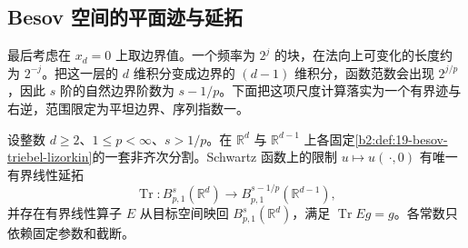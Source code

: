\subsection{Besov 空间的平面迹与延拓}
\label{b2:subsec:190505}

最后考虑在 \(x_d=0\) 上取边界值。一个频率为 \(2^j\) 的块，在法向上可变化的长度约为 \(2^{-j}\)。把这一层的 \(d\) 维积分变成边界的 \((d-1)\) 维积分，函数范数会出现 \(2^{j/p}\)，因此 \(s\) 阶的自然边界阶数为 \(s-1/p\)。下面把这项尺度计算落实为一个有界迹与右逆，范围限定为平坦边界、序列指数一。

\begin{proposition}
\label{b2:prop:19-flat-besov-trace}
设整数 \(d\geq2\)、\(1\leq p<\infty\)、\(s>1/p\)。在 \(\mathbb R^d\) 与 \(\mathbb R^{d-1}\) 上各固定\cref{b2:def:19-besov-triebel-lizorkin}的一套非齐次分割。Schwartz 函数上的限制 \(u\mapsto u(\,\cdot,0)\) 有唯一有界线性延拓
\[
 \operatorname{Tr}:B^s_{p,1}(\mathbb R^d)
 \longrightarrow B^{s-1/p}_{p,1}(\mathbb R^{d-1}),
\]
并存在有界线性算子 \(E\) 从目标空间映回 \(B^s_{p,1}(\mathbb R^d)\)，满足 \(\operatorname{Tr}Eg=g\)。各常数只依赖固定参数和截断。
\end{proposition}
